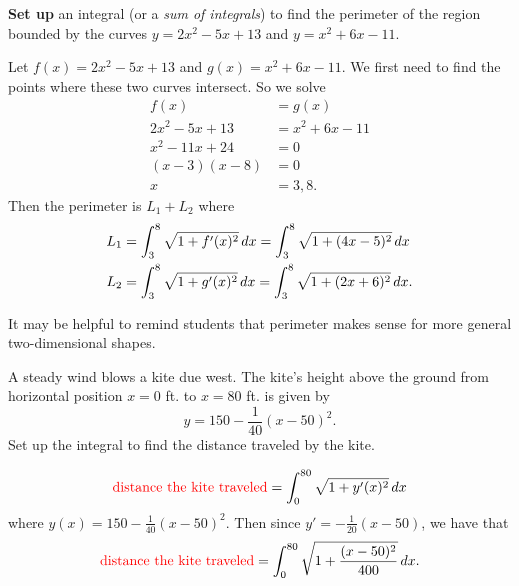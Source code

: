 \documentclass[handout,instructornotes]{ximera}
\begin{document}
\begin{problem}
{\bf Set up} an integral (or a {\it sum of integrals}) to find the perimeter of the region bounded by the curves $y=2x^2-5x+13$ and $y=x^2+6x-11$.
	\begin{freeResponse}
	Let $f(x) = 2x^2-5x+13$ and $g(x) = x^2+6x-11$.
	We first need to find the points where these two curves intersect.  
	So we solve
		\begin{align*}
		f(x) &= g(x)  \\
		2x^2-5x+13 &= x^2+6x-11  \\
		x^2-11x+24 &= 0  \\
		(x-3)(x-8) &= 0  \\
		x &= 3,8.
		\end{align*}
	Then the perimeter is $L_1 + L_2$ where
		\begin{align*}
		L_1 &= \int_3^8 \sqrt{1+f'(x)^2} \,d x = \int_3^8 \sqrt{1+(4x-5)^2} \,d x  \\
		L_2 &= \int_3^8 \sqrt{1+g'(x)^2} \,d x = \int_3^8 \sqrt{1+(2x+6)^2} \,d x.
		\end{align*}	
	\end{freeResponse}
	
\end{problem}

\begin{instructorNotes}
It may be helpful to remind students that perimeter makes sense for more general two-dimensional shapes.
\end{instructorNotes}














\begin{problem}
A steady wind blows a kite due west.  
The kite's height above the ground from horizontal position $x=0$ ft. to $x=80$ ft. is given by
	\[
	y = 150 - \frac{1}{40}(x-50)^2.
	\]
Set up the integral to find the distance traveled by the kite.  
	\begin{freeResponse}
		\[
		\text{{\color{red} distance the kite traveled}} = \int_0^{80} \sqrt{1+y'(x)^2} \,d x
		\]
	where $y(x) = 150 - \frac{1}{40}(x-50)^2$.  
	Then since $y' = - \frac{1}{20}(x-50)$, we have that
		\[
		\text{{\color{red} distance the kite traveled}} = \int_0^{80} \sqrt{1 + \frac{(x-50)^2}{400}} \,d x.
		\]
	\end{freeResponse}
		
\end{problem}
\end{document}
